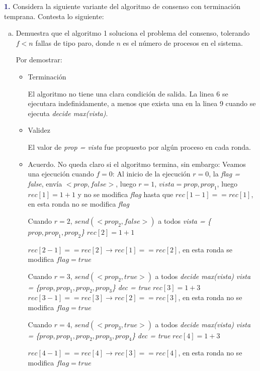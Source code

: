 \newpage
\textbf{\textcolor{MidnightBlue}{1.}} Considera la siguiente variante del algoritmo
de consenso con terminación temprana.
Contesta lo siguiente:
\begin{enumerate}[a)]
    \item Demuestra que el algoritmo 1 soluciona el problema del consenso,
    tolerando $f < n$ fallas de tipo paro, donde $n$ es el número de procesos en el sistema.

    Por demostrar:
    \begin{itemize}
        \item Terminación

        El algoritmo no tiene una clara condición de salida. La linea 6 se
        ejecutara indefinidamente, a menos que exista una en la linea 9 cuando
        se ejecuta \textit{decide max(vista)}.

        \item Validez

        El valor de \textit{prop = vista} fue propuesto por algún proceso en cada ronda.

        \item Acuerdo.
        No queda claro si el algoritmo termina, sin embargo:
        Veamos una ejecución cuando $f=0$:
        Al inicio de la ejecución $r=0$, la \textit{flag = false},
        envía $<prop,false>$, luego $r=1$,
        $vista = prop, prop_1$, luego
        $rec[1]= 1+1$ y no se modifica \textit{flag}
        hasta que $rec[1-1]==rec[1]$,
        en esta ronda no se modifica \textit{flag}


        Cuando $r=2$,
        $send(<prop_2,false>)$ a todos
        \textit{vista = \{$prop,prop_1,prop_2$\}}
        $rec[2]=1+1$

        $rec[2-1]==rec[2] \rightarrow rec[1]==rec[2]$, en esta ronda se modifica $flag=true$


        Cuando $r=3$,
        $send(<prop_2,true>)$ a todos
        \textit{decide max(vista)}
        \textit{vista = \{$prop,prop_1,prop_2,prop_3$\}}
        \textit{ dec = true}
        $rec[3]=1+3$
        $rec[3-1]==rec[3] \rightarrow rec[2]==rec[3]$, en esta ronda no se modifica $flag=true$


        Cuando $r=4$,
        $send(<prop_3,true>)$ a todos
        \textit{decide max(vista)}
        \textit{vista = \{$prop,prop_1,prop_2,prop_3,prop_4$\}}
        \textit{dec = true}
        $rec[4]=1+3$

        $rec[4-1]==rec[4] \rightarrow rec[3]==rec[4]$, en esta ronda no se modifica $flag=true$


\end{itemize}
\end{enumerate}
